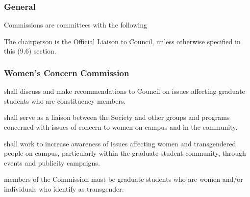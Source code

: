 \subsubsection{General}
\begin{longenum}[ label*=\thesubsubsection.\arabic*., align=left]
	\item Commissions are committees with the following %
    \begin{longenum}[ label*=\arabic*., align=left]
		\item The chairperson is the Official Liaison to Council, unless otherwise specified in this (9.6) section.
	\end{longenum}
\end{longenum}
\subsubsection {Women's Concern Commission}

\begin{longenum}[ label*=\thesubsubsection.\arabic*., align=left]
	\item shall discuss and make recommendations to Council on issues affecting graduate students who are constituency members.
    \item shall serve as a liaison between the Society and other groups and programs concerned with issues of concern to women on campus and in the community.
    \item shall work to increase awareness of issues affecting women and transgendered people on campus, particularly within the graduate student community, through events and publicity campaigns.
    \item members of the Commission must be graduate students who are women and/or individuals who identify as transgender.

\end{longenum}

\newpage
